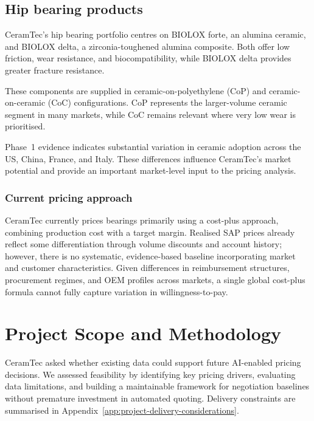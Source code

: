 \documentclass{article}
\begin{document}
\subsection{Hip bearing products}

CeramTec's hip bearing portfolio centres on BIOLOX\textregistered{} forte, an alumina ceramic, and BIOLOX\textregistered{} delta, a zirconia-toughened alumina composite. Both offer low friction, wear resistance, and biocompatibility, while BIOLOX\textregistered{} delta provides greater fracture resistance.

These components are supplied in ceramic-on-polyethylene (CoP) and ceramic-on-ceramic (CoC) configurations. CoP represents the larger-volume ceramic segment in many markets, while CoC remains relevant where very low wear is prioritised.

Phase~1 evidence indicates substantial variation in ceramic adoption across the US, China, France, and Italy. These differences influence CeramTec's market potential and provide an important market-level input to the pricing analysis.

\subsubsection{Current pricing approach}

CeramTec currently prices bearings primarily using a cost-plus approach, combining production cost with a target margin. Realised SAP prices already reflect some differentiation through volume discounts and account history; however, there is no systematic, evidence-based baseline incorporating market and customer characteristics. Given differences in reimbursement structures, procurement regimes, and OEM profiles across markets, a single global cost-plus formula cannot fully capture variation in willingness-to-pay.

\clearpage

\section{Project Scope and Methodology}

CeramTec asked whether existing data could support future AI-enabled pricing decisions. We assessed feasibility by identifying key pricing drivers, evaluating data limitations, and building a maintainable framework for negotiation baselines without premature investment in automated quoting. Delivery constraints are summarised in Appendix~\ref{app:project-delivery-considerations}.
\end{document}
